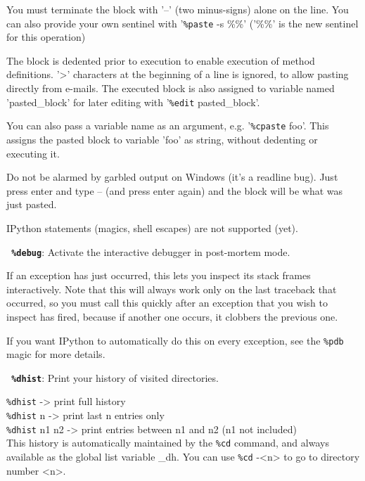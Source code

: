         You must terminate the block with '--' (two minus-signs) alone on the
        line. You can also provide your own sentinel with '\texttt{\%paste} -s \%\%' ('\%\%' 
        is the new sentinel for this operation)
        
        The block is dedented prior to execution to enable execution of 
        method definitions. '>' characters at the beginning of a line is
        ignored, to allow pasting directly from e-mails. The executed block
        is also assigned to variable named 'pasted\_block' for later editing
        with '\texttt{\%edit} pasted\_block'.
        
        You can also pass a variable name as an argument, e.g. '\texttt{\%cpaste} foo'.
        This assigns the pasted block to variable 'foo' as string, without 
        dedenting or executing it.
        
        Do not be alarmed by garbled output on Windows (it's a readline bug). 
        Just press enter and type -- (and press enter again) and the block 
        will be what was just pasted.
        
        IPython statements (magics, shell escapes) are not supported (yet).
        

\bigskip
\texttt{\textbf{ \%debug}}:
	Activate the interactive debugger in post-mortem mode.

        If an exception has just occurred, this lets you inspect its stack
        frames interactively.  Note that this will always work only on the last
        traceback that occurred, so you must call this quickly after an
        exception that you wish to inspect has fired, because if another one
        occurs, it clobbers the previous one.

        If you want IPython to automatically do this on every exception, see
        the \texttt{\%pdb} magic for more details.
        

\bigskip
\texttt{\textbf{ \%dhist}}:
	Print your history of visited directories.

        \texttt{\%dhist}       -> print full history\\
        \texttt{\%dhist} n     -> print last n entries only\\
        \texttt{\%dhist} n1 n2 -> print entries between n1 and n2 (n1 not included)\\

        This history is automatically maintained by the \texttt{\%cd} command, and
        always available as the global list variable \_dh. You can use \texttt{\%cd} -<n>
        to go to directory number <n>.


